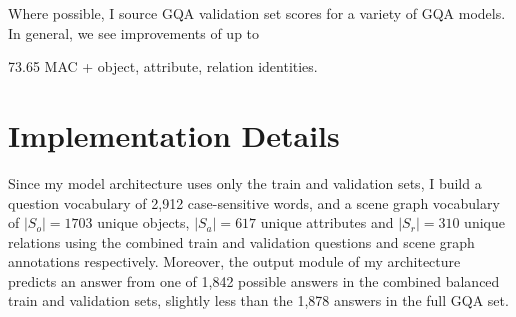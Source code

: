 
Where possible, I source GQA validation set scores for a variety of GQA models. In general, we see improvements of up to 



73.65 MAC + object, attribute, relation identities.



\section{Implementation Details}

Since my model architecture uses only the train and validation sets, I build a question vocabulary of 2,912 case-sensitive words, and a scene graph vocabulary of \(|S_o| = 1703\) unique objects, \(|S_a| = 617\) unique attributes and \(|S_r| = 310\) unique relations using the combined train and validation questions and scene graph annotations respectively. Moreover, the output module of my architecture predicts an answer from one of 1,842 possible answers in the combined balanced train and validation sets, slightly less than the 1,878 answers in the full GQA set.

